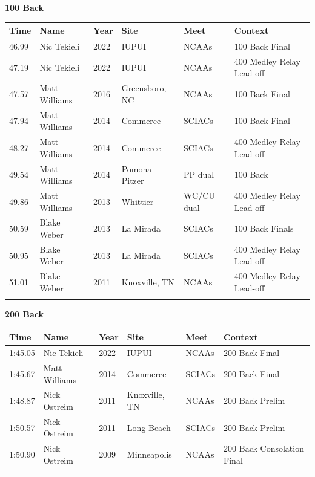 \vspace{1.2em}
\noindent\begin{minipage}[t]{0.98\textwidth}
\centering
\textbf{\textcolor{teamprimary}{100 Back}}\par
\vspace{0.5em}
\centering
\small
\renewcommand{\arraystretch}{1.0}
\setlength{\tabcolsep}{4pt}
\begin{tabular}{@{}p{2.0cm}p{3.2cm}p{1.2cm}p{2.0cm}p{2.0cm}p{2.5cm}@{}}
\toprule
\textbf{Time} & \textbf{Name} & \textbf{Year} & \textbf{Site} & \textbf{Meet} & \textbf{Context} \\
\midrule
46.99 & Nic Tekieli & 2022 & IUPUI & NCAAs & 100 Back Final \\
47.19 & Nic Tekieli & 2022 & IUPUI & NCAAs & 400 Medley Relay Lead-off \\
47.57 & Matt Williams & 2016 & Greensboro, NC & NCAAs & 100 Back Final \\
47.94 & Matt Williams & 2014 & Commerce & SCIACs & 100 Back Final \\
48.27 & Matt Williams & 2014 & Commerce & SCIACs & 400 Medley Relay Lead-off \\
49.54 & Matt Williams & 2014 & Pomona-Pitzer & PP dual & 100 Back \\
49.86 & Matt Williams & 2013 & Whittier & WC/CU dual & 400 Medley Relay Lead-off \\
50.59 & Blake Weber & 2013 & La Mirada & SCIACs & 100 Back Finals \\
50.95 & Blake Weber & 2013 & La Mirada & SCIACs & 400 Medley Relay Lead-off \\
51.01 & Blake Weber & 2011 & Knoxville, TN & NCAAs & 400 Medley Relay Lead-off \\
\bottomrule
\vspace{0.5em}
\end{tabular}
\end{minipage}
\vspace{1.2em}
\noindent\begin{minipage}[t]{0.98\textwidth}
\centering
\textbf{\textcolor{teamprimary}{200 Back}}\par
\vspace{0.5em}
\centering
\small
\renewcommand{\arraystretch}{1.0}
\setlength{\tabcolsep}{4pt}
\begin{tabular}{@{}p{2.0cm}p{3.2cm}p{1.2cm}p{2.0cm}p{2.0cm}p{2.5cm}@{}}
\toprule
\textbf{Time} & \textbf{Name} & \textbf{Year} & \textbf{Site} & \textbf{Meet} & \textbf{Context} \\
\midrule
1:45.05 & Nic Tekieli & 2022 & IUPUI & NCAAs & 200 Back Final \\
1:45.67 & Matt Williams & 2014 & Commerce & SCIACs & 200 Back Final \\
1:48.87 & Nick Ostreim & 2011 & Knoxville, TN & NCAAs & 200 Back Prelim \\
1:50.57 & Nick Ostreim & 2011 & Long Beach & SCIACs & 200 Back Prelim \\
1:50.90 & Nick Ostreim & 2009 & Minneapolis & NCAAs & 200 Back Consolation Final \\
\bottomrule
\vspace{0.5em}
\end{tabular}
\end{minipage}
